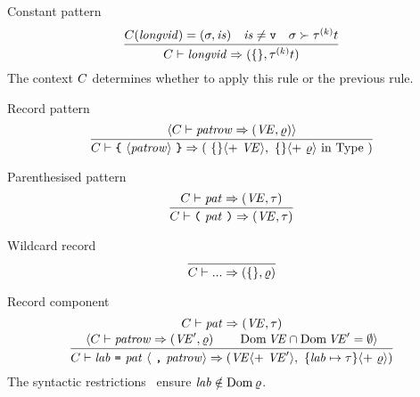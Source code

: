 \begin{inference-rule}{Constant pattern}
\begin{equation}\label{rule:static-core:constant-pattern}
  \vcenter{\infer{\C\ts\longvid\ra (\emptymap,\tauk\t)}
    {\C(\longvid)=(\sigma,\is)
      & \is\neq\isv
      & \sigma\succ\tauk\t}}
\end{equation}
The context $C$ determines whether to apply this rule or the previous rule.
\end{inference-rule}

\begin{inference-rule}{Record pattern}
\begin{equation}\label{rule:static-core:record-pattern}
  \vcenter{\infer{\C\ts\lttbrace\ \recpat\ \rttbrace\ra(\ \emptymap\optional{ +\ \VE},\ \emptymap
      \optional{ +\ \varrho}\ \In\ \Type\ )}
    {\optional{\C\ts\labpats\ra(\VE,\varrho)}}}
\end{equation}
\end{inference-rule}

\begin{inference-rule}{Parenthesised pattern}
\begin{equation}\label{rule:static-core:paren-pattern}
  \vcenter{\infer{\C\ts\parpat\ra(\VE,\tau)}
    {\C\ts\pat\ra(\VE,\tau)}}
\end{equation}
\end{inference-rule}


\begin{inference-rule}{Wildcard record}
\begin{equation}\label{rule:static-core:wildcard-record}
\vcenter{\infer{\C\ts\wildcardrow\ra(\emptymap,\varrho)}{}}
\end{equation}
\end{inference-rule}

\begin{inference-rule}{Record component}
\begin{equation}\label{rule:static-core:record-component}
  \vcenter{\infer{\C\ts\longlabpats\ra
     (\VE\optional{ +\ \VE'\rangle,\ \{\lab\mapsto\tau\}\langle +\ \varrho})}
    {\deduce{\optional{\C\ts\labpats\ra(\VE',\varrho)\qquad\Dom\VE\cap\Dom\VE' = \emptyset}}
      {\C\ts\pat\ra(\VE,\tau)}}}
\end{equation}
The syntactic restrictions~ ensure $\textit{lab\/}\notin\mathop{\rm Dom}\nolimits\varrho$.
\end{inference-rule}

